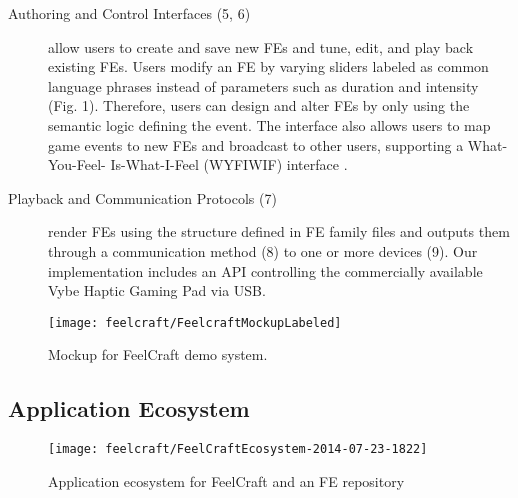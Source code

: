 \begin{description}
	\item[Authoring and Control Interfaces (5, 6)] allow users to create and save new
FEs and tune, edit, and play back existing FEs. Users modify an FE by varying sliders labeled as common language phrases instead of parameters such as duration and intensity (Fig. 1). Therefore, users can design and alter FEs by only using the semantic logic defining the event. The interface also allows users to map game events to new FEs and broadcast to other users, supporting a What-You-Feel- Is-What-I-Feel (WYFIWIF) interface \cite{Schneider2014}.

	\item[Playback and Communication Protocols (7)] render FEs using the structure
defined in FE family files and outputs them through a communication method (8) to one or more devices (9). Our implementation includes an API controlling the commercially available Vybe Haptic Gaming Pad via USB.
\end{description}

\begin{figure}[htbp] %
   \centering
   \texttt{[image: feelcraft/FeelcraftMockupLabeled]} 
   \caption{Mockup for FeelCraft demo system.}
   \label{fig:feelcraft:mockup}
\end{figure}


\subsection{Application Ecosystem}

\begin{figure}[htbp] %
   \centering
   \texttt{[image: feelcraft/FeelCraftEcosystem-2014-07-23-1822]} 
   \caption{ Application ecosystem for FeelCraft and an FE repository}
   \label{fig:feelcraft:ecosystem}
\end{figure}

